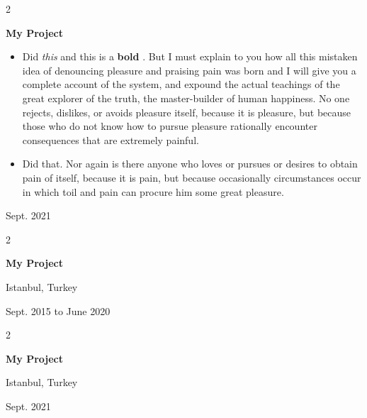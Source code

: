 \documentclass[10pt, letterpaper]{article}
\newenvironment{highlights}{
    \begin{itemize}[
        topsep=0.10 cm,
        parsep=0.10 cm,
        partopsep=0pt,
        itemsep=0pt,
        leftmargin=0.4 cm + 10pt
    ]
}{
    \end{itemize}
} %
\newenvironment{twocolentry}[2][]{
    \onecolentry
    \def\secondColumn{#2}
    \setcolumnwidth{\fill, 4.5 cm}
    \begin{paracol}{2}
}{
    \switchcolumn \raggedleft \secondColumn
    \end{paracol}
    \endonecolentry
} %
\let\hrefWithoutArrow\href
\renewcommand{\href}[2]{\hrefWithoutArrow{#1}{\mbox{\ifthenelse{\equal{#2}{}}{ }{#2 }\raisebox{.15ex}{\footnotesize \faExternalLink*}}}}
\begin{document}
        \vspace{0.2 cm}

        \begin{twocolentry}{
            Sept. 2021
        }
            \textbf{My Project}
            \begin{highlights}
                \item Did \textit{this} and this is a \textbf{bold} \href{https://example.com}{link}. But I must explain to you how all this mistaken idea of denouncing pleasure and praising pain was born and I will give you a complete account of the system, and expound the actual teachings of the great explorer of the truth, the master-builder of human happiness. No one rejects, dislikes, or avoids pleasure itself, because it is pleasure, but because those who do not know how to pursue pleasure rationally encounter consequences that are extremely painful.
                \item Did that. Nor again is there anyone who loves or pursues or desires to obtain pain of itself, because it is pain, but because occasionally circumstances occur in which toil and pain can procure him some great pleasure.
            \end{highlights}
        \end{twocolentry}


        \vspace{0.2 cm}

        \begin{twocolentry}{
            Istanbul, Turkey

        Sept. 2015 to June 2020
        }
            \textbf{My Project}
        \end{twocolentry}


        \vspace{0.2 cm}

        \begin{twocolentry}{
            Istanbul, Turkey

        Sept. 2021
        }
            \textbf{My Project}
        \end{twocolentry}


        \vspace{0.2 cm}
\end{document}
